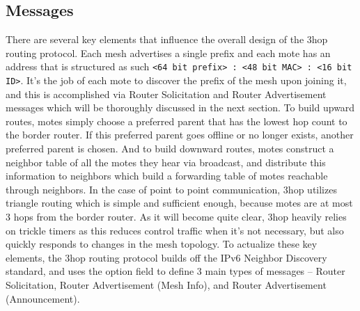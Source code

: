 \subsection{Messages}
There are several key elements that influence the overall design of the 3hop routing protocol.
Each mesh advertises a single prefix and each mote has an address that is structured as such \texttt{<64 bit prefix> : <48 bit MAC> : <16 bit ID>}.
It's the job of each mote to discover the prefix of the mesh upon joining it, and this is accomplished via Router Solicitation and Router Advertisement messages which will be thoroughly discussed in the next section.
To build upward routes, motes simply choose a preferred parent that has the lowest hop count to the border router.
If this preferred parent goes offline or no longer exists, another preferred parent is chosen.
And to build downward routes, motes construct a neighbor table of all the motes they hear via broadcast, and distribute this information to neighbors which build a forwarding table of motes reachable through neighbors.
In the case of point to point communication, 3hop utilizes triangle routing which is simple and sufficient enough, because motes are at most 3 hops from the border router.
As it will become quite clear, 3hop heavily relies on trickle timers as this reduces control traffic when it's not necessary, but also quickly responds to changes in the mesh topology.
To actualize these key elements, the 3hop routing protocol builds off the IPv6 Neighbor Discovery standard, and uses the option field to define 3 main types of messages -- Router Solicitation, Router Advertisement (Mesh Info), and Router Advertisement (Announcement).

